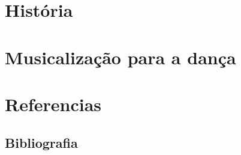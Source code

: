 \documentclass[12pt]{extbook} %
\def \SourceRootPath{.}
\begin{document}
\part{História}




\part{Musicalização para a dança}





\part{Referencias}

\chapter*{Bibliografia}
\printbibliography[heading=bibempty]

\cleardoublepage
{}
\setlength{\columnsep}{0.75cm}
\printindex



\end{document}
